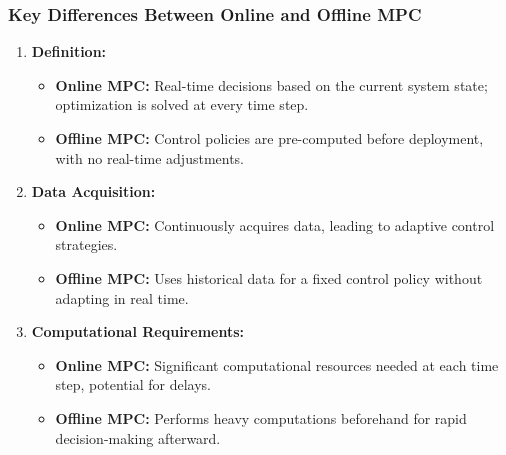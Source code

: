 \documentclass[aspectratio=169]{beamer}
\begin{document}
\begin{frame}[fragile]
    \frametitle{Key Differences Between Online and Offline MPC}
    \begin{enumerate}
        \item \textbf{Definition:}
            \begin{itemize}
                \item \textbf{Online MPC:} Real-time decisions based on the current system state; optimization is solved at every time step.
                \item \textbf{Offline MPC:} Control policies are pre-computed before deployment, with no real-time adjustments.
            \end{itemize}
            
        \item \textbf{Data Acquisition:}
            \begin{itemize}
                \item \textbf{Online MPC:} Continuously acquires data, leading to adaptive control strategies.
                \item \textbf{Offline MPC:} Uses historical data for a fixed control policy without adapting in real time.
            \end{itemize}
    
        \item \textbf{Computational Requirements:}
            \begin{itemize}
                \item \textbf{Online MPC:} Significant computational resources needed at each time step, potential for delays.
                \item \textbf{Offline MPC:} Performs heavy computations beforehand for rapid decision-making afterward.
            \end{itemize}
    \end{enumerate}
\end{frame}
\end{document}
